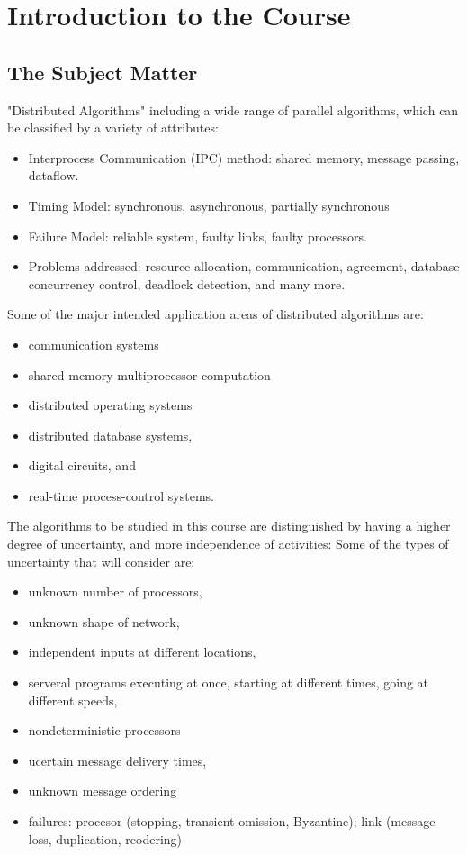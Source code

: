 \documentclass{report}
\theoremstyle{plain}
\theoremstyle{definition}
\theoremstyle{remark}
\begin{document}
\section{Introduction to the Course}

\subsection{The Subject Matter}

"Distributed Algorithms" including a wide range of parallel algorithms,
which can be classified by a variety of attributes: 

\begin{itemize}
    \item Interprocess Communication (IPC) method: shared memory, message passing, dataflow.
    \item Timing Model: synchronous, asynchronous, partially synchronous
    \item Failure Model: reliable system, faulty links, faulty processors. 
    \item Problems addressed: resource allocation, communication, agreement, database concurrency control, deadlock detection, and many more. 
\end{itemize}

Some of the major intended application areas of distributed algorithms are: 
\begin{itemize}
    \item communication systems
    \item shared-memory multiprocessor computation 
    \item distributed operating systems
    \item distributed database systems, 
    \item digital circuits, and 
    \item real-time process-control systems. 
\end{itemize}

The algorithms to be studied in this course are distinguished by having a higher
degree of uncertainty, and more independence of activities: Some of the types of
uncertainty that will consider are: 
\begin{itemize}
    \item unknown number of processors, 
    \item unknown shape of network, 
    \item independent inputs at different locations, 
    \item serveral programs executing at once, starting at different times, going at different speeds, 
    \item nondeterministic processors
    \item ucertain message delivery times, 
    \item unknown message ordering
    \item failures: procesor (stopping, transient omission, Byzantine); link (message loss, duplication, reodering)
\end{itemize}
\end{document}
